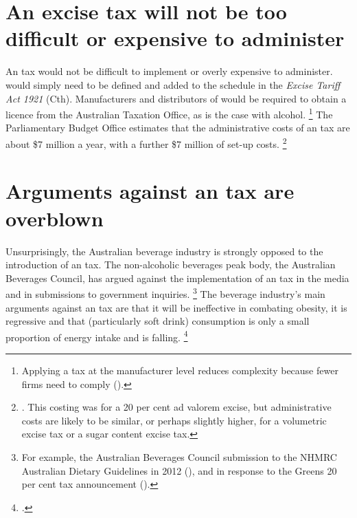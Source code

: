 \documentclass[embargoed]{grattan}
\begin{document}
\section{An excise tax will not be too difficult or expensive to administer}\label{an-excise-tax-will-not-be-too-difficult-or-expensive-to-administer}

An \SSB{} tax would not be difficult to implement or overly expensive to administer.
\SSBs{} would simply need to be defined and added to the schedule in the \emph{Excise Tariff Act 1921} (Cth).
Manufacturers and distributors of \SSBs{} would be required to obtain a licence from the Australian Taxation Office, as is the case with alcohol.%
\footnote{Applying a tax at the manufacturer level reduces complexity because fewer firms need to comply (\textcites{CnossenExcisetaxationAustralia}{Freebairn2010Taxationobesity}).} 
The Parliamentary Budget Office estimates that the administrative costs of an \SSB{} tax are about \$7 million a year, with a further \$7 million of set-up costs.%
\footnote{\textcite{Office2016PolicycostingAustralian}.
This costing was for a 20 per cent ad valorem excise, but administrative costs are likely to be similar, or perhaps slightly higher, for a volumetric excise tax or a sugar content excise tax.}


\section{Arguments against an \SSB{} tax are overblown}\label{arguments-against-an-ssb-tax-are-overblown}

Unsurprisingly, the Australian beverage industry is strongly opposed to the introduction of an \SSB{} tax.
The non-alcoholic beverages peak body, the Australian Beverages Council, has argued against the implementation of an \SSB{} tax in the media and in submissions to government inquiries.%
\footnote{For example, the Australian Beverages Council submission to the NHMRC Australian Dietary Guidelines in 2012 (\textcite{Council2012AustralianBeveragesCouncil}), and in response to the Greens 20 per cent \SSB{} tax announcement (\textcite{Council2016Softdrinktax}).} The beverage industry's main arguments against an \SSB{} tax are that it will be ineffective in combating obesity, it is regressive and that \SSB{} (particularly soft drink) consumption is only a small proportion of energy intake and is falling.%
\footcite{Sharma2014effectstaxingsugarsweetened}  
\end{document}
